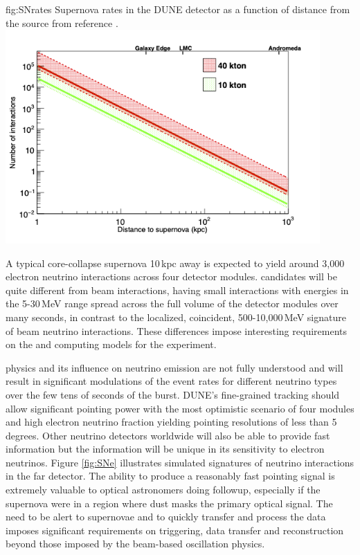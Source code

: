 \documentclass[../main-v1.tex]{subfiles}
\begin{document}
\begin{dunefigure}
{fig:SNrates}
{
Supernova rates in the DUNE detector  as a function of distance from the source from reference \cite{DUNE:2020zfm}.}
\includegraphics[width=0.9\textwidth]{graphics/IntroFigures/argon_sn.png}
\end{dunefigure}

A typical core-collapse supernova 10\,kpc away is expected to yield around 3,000   electron neutrino interactions across four detector modules.  candidates will be quite different from beam interactions, having small interactions with energies in the 5-30\,MeV range spread across the full volume of the detector modules over many seconds, in contrast to the localized, coincident,  500-10,000\,MeV signature of beam neutrino interactions. These differences impose interesting requirements on the  and computing models for the experiment.  


 physics and its influence on neutrino emission are not fully understood and will result in significant modulations of the event rates for different neutrino types  over the few tens of seconds of the burst.  DUNE's fine-grained tracking should allow significant pointing power with the most optimistic scenario of four modules and high electron neutrino fraction yielding pointing resolutions of less than 5 degrees. Other neutrino detectors worldwide will also be able to provide fast information but the  information will be unique in its sensitivity to electron neutrinos. Figure \ref{fig:SNe} illustrates simulated signatures of  neutrino interactions in the far detector. The ability to produce a reasonably fast pointing signal is extremely valuable to optical astronomers doing followup, especially if the supernova were in a region where dust masks the primary optical signal.   The need to be alert to supernovae and to quickly transfer and process the data imposes significant requirements on triggering, data transfer and reconstruction beyond those imposed by the %
beam-based oscillation physics. 
\end{document}
